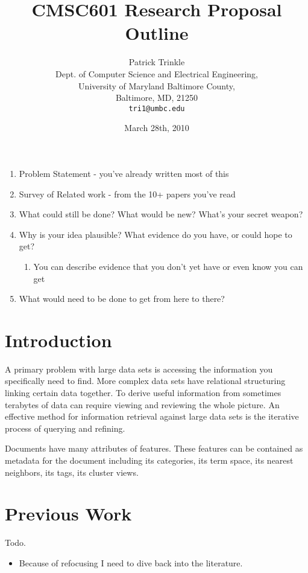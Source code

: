 \documentclass[11pt]{article}
\title{CMSC601 Research Proposal Outline}
\author{Patrick Trinkle\\
Dept. of Computer Science and Electrical Engineering,\\
University of Maryland Baltimore County,\\
Baltimore, MD, 21250\\
\texttt{tri1@umbc.edu}}
\date{March 28th, 2010}
\begin{document}
\maketitle

\begin{enumerate}
\item Problem Statement - you've already written most of this
\item Survey of Related work - from the 10+ papers you've read
\item What could still be done? What would be new? What's your secret weapon?
\item Why is your idea plausible? What evidence do you have, or could hope to get? 
\begin{enumerate}
\item You can describe evidence that you don't yet have or even know you can get
\end{enumerate}
\item What would need to be done to get from here to there?
\end{enumerate}

\section{Introduction}

A primary problem with large data sets is accessing the information you specifically need to find.  More complex data sets have relational structuring linking certain data together.  To derive useful information from sometimes terabytes of data can require viewing and reviewing the whole picture.  An effective method for information retrieval against large data sets is the iterative process of querying and refining.

Documents have many attributes of features.  These features can be contained as metadata for the document including its categories, its term space, its nearest neighbors, its tags, its cluster views.

\section{Previous Work}

Todo.

\begin{itemize}
\item Because of refocusing I need to dive back into the literature.
\end{itemize}
\end{document}
